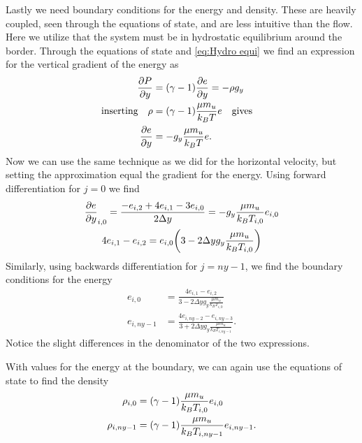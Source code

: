 \documentclass[11pt,a4paper,twocolumn,titlepage]{article}
\begin{document}
Lastly we need boundary conditions for the energy and density. These are heavily coupled, seen through the equations of state, and are less intuitive than the flow. Here we utilize that the system must be in hydrostatic equilibrium around the border. Through the equations of state and \cref{eq:Hydro equi} we find an expression for the vertical gradient of the energy as
\begin{align*}
\pdv{P}{y} &= (\gamma-1) \pdv{e}{y} = -\rho g_y
\\
\qq*{inserting} \rho &= (\gamma-1)\frac{\mu m_u }{k_BT}e \qq{gives}
\\
\pdv{e}{y} &= - g_y \frac{\mu m_u}{k_BT}e.
\end{align*}
Now we can use the same technique as we did for the horizontal velocity, but setting the approximation equal the gradient for the energy. Using forward differentiation for $j=0$ we find
\begin{gather*}
\pdv{e}{y}_{i,0} = \frac{-e_{i,2}+4e_{i,1}-3e_{i,0}}{2\Delta y} = - g_y \frac{\mu m_u}{k_BT_{i,0}}e_{i,0}
\\
4e_{i,1}-e_{i,2}= e_{i,0}\qty(3-2\Delta y g_y\frac{\mu m_u}{k_BT_{i,0}}) 
\end{gather*}
Similarly, using backwards differentiation for $j=ny-1$, we find the boundary conditions for the energy
\begin{equation}
\begin{aligned}
e_{i,0} &= \frac{4e_{i,1}-e_{i,2}}{3-2\Delta y g_y\frac{\mu m_u}{k_BT_{i,0}}}
\\
e_{i,ny-1} &= \frac{4e_{i,ny-2}-e_{i,ny-3}}{3 + 2\Delta y g_y \frac{\mu m_u}{k_B T_{i,ny-1}}}.
\end{aligned}
\label{eq:Boundary e}
\end{equation}
Notice the slight differences in the denominator of the two expressions.

With values for the energy at the boundary, we can again use the equations of state to find the density
\begin{equation}
\begin{aligned}
\rho_{i,0} &= \qty(\gamma-1) \frac{\mu m_u}{k_BT_{i,0}}e_{i,0}
\\
\rho_{i,ny-1} &= \qty(\gamma-1) \frac{\mu m_u}{k_BT_{i,ny-1}}e_{i,ny-1}.
\end{aligned}
\label{eq:Boundary rho}
\end{equation}


\end{document}
